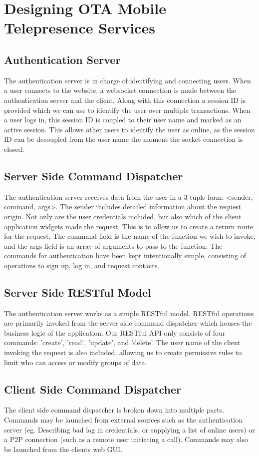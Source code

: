 \documentclass[a4paper,12pt]{report}
\begin{document}
\chapter{Designing OTA Mobile Telepresence Services}
\section{Authentication Server}
The authentication server is in charge of identifying and connecting users. When a user connects to the website, a websocket connection is made between the authentication server and the client. Along with this connection a session ID is provided which we can use to identify the user over multiple transactions. When a user logs in, this session ID is coupled to their user name and marked as an active session. This allows other users to identify the user as online, as the session ID can be decoupled from the user name the moment the socket connection is closed.
\section{Server Side Command Dispatcher}
The authentication server receives data from the user in a 3-tuple form: <sender, command, args>. The sender includes detailed information about the request origin. Not only are the user credentials included, but also which of the client application widgets made the request. This is to allow us to create a return route for the request. The command field is the name of the function we wish to invoke, and the args field is an array of arguments to pass to the function. The commands for authentication have been kept intentionally simple, consisting of operations to sign up, log in, and request contacts. 
\section{Server Side RESTful Model}
The authentication server works as a simple RESTful model. RESTful operations are primarily invoked from the server side command dispatcher which houses the business logic of the application. Our RESTful API only consists of four commands: 'create', 'read', 'update', and 'delete'. The user name of the client invoking the request is also included, allowing us to create permissive rules to limit who can access or modify groups of data.
\section{Client Side Command Dispatcher}
The client side command dispatcher is broken down into multiple parts. Commands may be launched from external sources such as the authentication server (eg. Describing bad log in credentials, or supplying a list of online users) or a P2P connection (such as a remote user initiating a call). Commands may also be launched from the clients web GUI.
\end{document}

